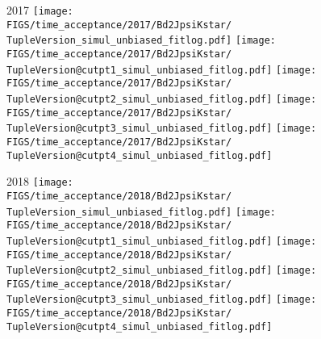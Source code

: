\begin{frame}
  2017
  \texttt{[image: \\FIGS/time\_acceptance/2017/Bd2JpsiKstar/\\TupleVersion\_simul\_unbiased\_fitlog.pdf]}
  \texttt{[image: \\FIGS/time\_acceptance/2017/Bd2JpsiKstar/\\TupleVersion@cutpt1\_simul\_unbiased\_fitlog.pdf]}
  \texttt{[image: \\FIGS/time\_acceptance/2017/Bd2JpsiKstar/\\TupleVersion@cutpt2\_simul\_unbiased\_fitlog.pdf]}
  \texttt{[image: \\FIGS/time\_acceptance/2017/Bd2JpsiKstar/\\TupleVersion@cutpt3\_simul\_unbiased\_fitlog.pdf]}
  \texttt{[image: \\FIGS/time\_acceptance/2017/Bd2JpsiKstar/\\TupleVersion@cutpt4\_simul\_unbiased\_fitlog.pdf]}
  \vspace*{2mm}

  2018
  \texttt{[image: \\FIGS/time\_acceptance/2018/Bd2JpsiKstar/\\TupleVersion\_simul\_unbiased\_fitlog.pdf]}
  \texttt{[image: \\FIGS/time\_acceptance/2018/Bd2JpsiKstar/\\TupleVersion@cutpt1\_simul\_unbiased\_fitlog.pdf]}
  \texttt{[image: \\FIGS/time\_acceptance/2018/Bd2JpsiKstar/\\TupleVersion@cutpt2\_simul\_unbiased\_fitlog.pdf]}
  \texttt{[image: \\FIGS/time\_acceptance/2018/Bd2JpsiKstar/\\TupleVersion@cutpt3\_simul\_unbiased\_fitlog.pdf]}
  \texttt{[image: \\FIGS/time\_acceptance/2018/Bd2JpsiKstar/\\TupleVersion@cutpt4\_simul\_unbiased\_fitlog.pdf]}

\end{frame} %



